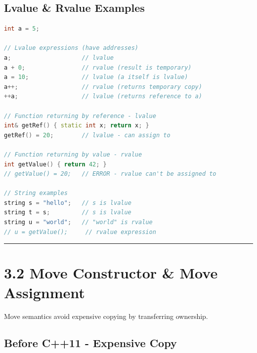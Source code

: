 \hypertarget{lvalue-rvalue-examples}{%
\subsection{Lvalue \& Rvalue Examples}\label{lvalue-rvalue-examples}}

\begin{lstlisting}[language={C++}]
int a = 5;

// Lvalue expressions (have addresses)
a;                    // lvalue
a + 0;                // rvalue (result is temporary)
a = 10;               // lvalue (a itself is lvalue)
a++;                  // rvalue (returns temporary copy)
++a;                  // lvalue (returns reference to a)

// Function returning by reference - lvalue
int& getRef() { static int x; return x; }
getRef() = 20;        // lvalue - can assign to

// Function returning by value - rvalue
int getValue() { return 42; }
// getValue() = 20;   // ERROR - rvalue can't be assigned to

// String examples
string s = "hello";   // s is lvalue
string t = s;         // s is lvalue
string u = "world";   // "world" is rvalue
// u = getValue();     // rvalue expression
\end{lstlisting}

\begin{center}\rule{0.5\linewidth}{0.5pt}\end{center}

\hypertarget{move-constructor-move-assignment}{%
\section{3.2 Move Constructor \& Move
Assignment}\label{move-constructor-move-assignment}}

Move semantics avoid expensive copying by transferring ownership.

\hypertarget{before-c11---expensive-copy}{%
\subsection{Before C++11 - Expensive
Copy}\label{before-c11---expensive-copy}}


